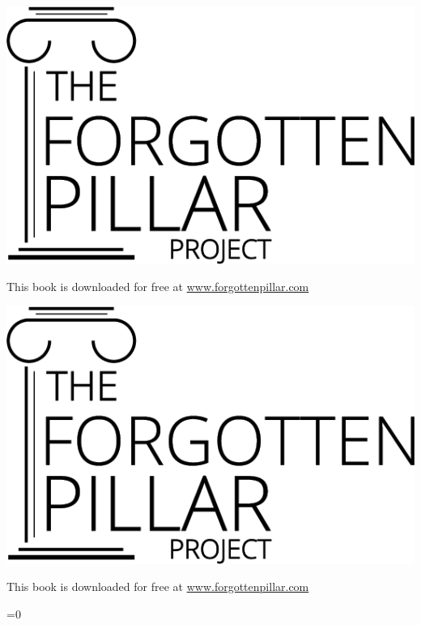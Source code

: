 {\ifepub
    \includegraphics[width=\linewidth]{images/logo-black.png}

    This book is downloaded for free at \href{https://forgottenpillar.com/book/the-forgotten-pillar}{www.forgottenpillar.com}
\else
    \noindent
    \begin{minipage}{0.3\textwidth}
        \includegraphics[width=\linewidth]{images/logo-black.png}
    \end{minipage}%
    \hfill
    \begin{minipage}{\dimexpr\linewidth-0.3\textwidth-0.125\textwidth-1em\relax}
        \raggedleft\footnotesize
        This book is downloaded for free at \href{https://forgottenpillar.com/book/the-forgotten-pillar?lang=\currentlang&type=\currentlayout}{www.forgottenpillar.com}
    \end{minipage}%
    \ifnum{}=0
    \else
        \hfill
        \begin{minipage}{0.125\textwidth}
            \centering
        \end{minipage}
    \fi%
\fi
}

\pagebreak